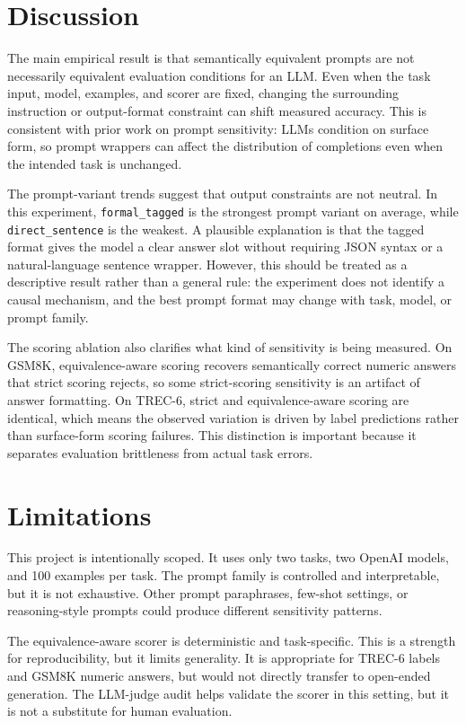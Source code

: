 \documentclass[11pt]{article}
\begin{document}
\section{Discussion}

The main empirical result is that semantically equivalent prompts are not necessarily equivalent evaluation conditions for an LLM. Even when the task input, model, examples, and scorer are fixed, changing the surrounding instruction or output-format constraint can shift measured accuracy. This is consistent with prior work on prompt sensitivity: LLMs condition on surface form, so prompt wrappers can affect the distribution of completions even when the intended task is unchanged.

The prompt-variant trends suggest that output constraints are not neutral. In this experiment, \texttt{formal\_tagged} is the strongest prompt variant on average, while \texttt{direct\_sentence} is the weakest. A plausible explanation is that the tagged format gives the model a clear answer slot without requiring JSON syntax or a natural-language sentence wrapper. However, this should be treated as a descriptive result rather than a general rule: the experiment does not identify a causal mechanism, and the best prompt format may change with task, model, or prompt family.

The scoring ablation also clarifies what kind of sensitivity is being measured. On GSM8K, equivalence-aware scoring recovers semantically correct numeric answers that strict scoring rejects, so some strict-scoring sensitivity is an artifact of answer formatting. On TREC-6, strict and equivalence-aware scoring are identical, which means the observed variation is driven by label predictions rather than surface-form scoring failures. This distinction is important because it separates evaluation brittleness from actual task errors.

\section{Limitations}

This project is intentionally scoped. It uses only two tasks, two OpenAI models, and 100 examples per task. The prompt family is controlled and interpretable, but it is not exhaustive. Other prompt paraphrases, few-shot settings, or reasoning-style prompts could produce different sensitivity patterns.

The equivalence-aware scorer is deterministic and task-specific. This is a strength for reproducibility, but it limits generality. It is appropriate for TREC-6 labels and GSM8K numeric answers, but would not directly transfer to open-ended generation. The LLM-judge audit helps validate the scorer in this setting, but it is not a substitute for human evaluation.
\end{document}
